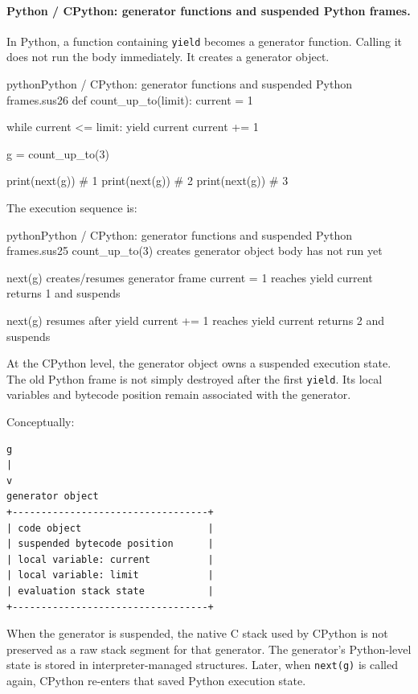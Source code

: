 \paragraph{Python / CPython: generator functions and suspended Python frames.}

In Python, a function containing \texttt{yield} becomes a generator function. Calling it does not run the body immediately. It creates a generator object.

\begin{codebox}[]{python}{Python / CPython: generator functions and suspended Python frames.}{sus26}
def count_up_to(limit):
    current = 1

    while current <= limit:
        yield current
        current += 1


g = count_up_to(3)

print(next(g))  # 1
print(next(g))  # 2
print(next(g))  # 3
\end{codebox}


The execution sequence is:

\begin{codebox}[]{python}{Python / CPython: generator functions and suspended Python frames.}{sus25}
count_up_to(3)
    creates generator object
    body has not run yet

next(g)
    creates/resumes generator frame
    current = 1
    reaches yield current
    returns 1 and suspends

next(g)
    resumes after yield
    current += 1
    reaches yield current
    returns 2 and suspends
\end{codebox}


At the CPython level, the generator object owns a suspended execution state. The old Python frame is not simply destroyed after the first \texttt{yield}. Its local variables and bytecode position remain associated with the generator.

Conceptually:

\begin{verbatim}
g
|
v
generator object
+----------------------------------+
| code object                      |
| suspended bytecode position      |
| local variable: current          |
| local variable: limit            |
| evaluation stack state           |
+----------------------------------+
\end{verbatim}

When the generator is suspended, the native C stack used by CPython is not preserved as a raw stack segment for that generator. The generator's Python-level state is stored in interpreter-managed structures. Later, when \texttt{next(g)} is called again, CPython re-enters that saved Python execution state.

